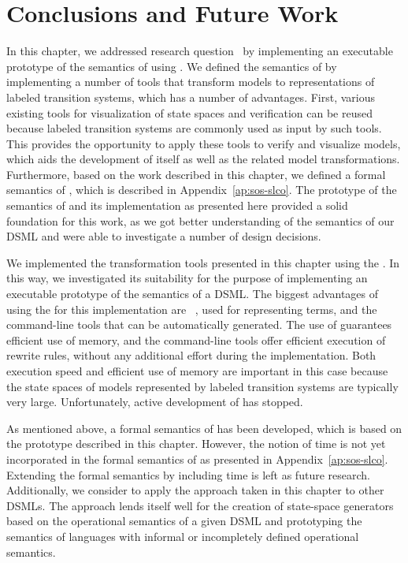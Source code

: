 \section{Conclusions and Future Work}
\label{sec:prototype-semantics:Conclusions_and_Future_Work}

In this chapter, we addressed research question~ by implementing an executable prototype of the semantics of \SLCO using \ASFSDF.
We defined the semantics of \SLCO by implementing a number of tools that transform \SLCO models to representations of labeled transition systems, which has a number of advantages.
First, various existing tools for visualization of state spaces and verification can be reused because labeled transition systems are commonly used as input by such tools.
This provides the opportunity to apply these tools to verify and visualize \SLCO models, which aids the development of \SLCO itself as well as the related model transformations.
Furthermore, based on the work described in this chapter, we defined a formal semantics of \SLCO, which is described in Appendix~\ref{ap:sos-slco}.
The prototype of the semantics of \SLCO and its implementation as presented here provided a solid foundation for this work, as we got better understanding of the semantics of our DSML and were able to investigate a number of design decisions.

We implemented the transformation tools presented in this chapter using the \ASFSDFME.
In this way, we investigated its suitability for the purpose of implementing an executable prototype of the semantics of a DSML.
The biggest advantages of using the \ASFSDFME for this implementation are \ATerms~\cite{Brand:2007:AME:1219180.1219600}, used for representing terms, and the command-line tools that can be automatically generated.
The use of \ATerms guarantees efficient use of memory, and the command-line tools offer efficient execution of rewrite rules, without any additional effort during the implementation.
Both execution speed and efficient use of memory are important in this case because the state spaces of models represented by labeled transition systems are typically very large.
Unfortunately, active development of \ASFSDF has stopped.

As mentioned above, a formal semantics of \SLCO has been developed, which is based on the prototype described in this chapter.
However, the notion of time is not yet incorporated in the formal semantics of \SLCO as presented in Appendix~\ref{ap:sos-slco}.
Extending the formal semantics by including time is left as future research.
Additionally, we consider to apply the approach taken in this chapter to other DSMLs.
The approach lends itself well for the creation of state-space generators based on the operational semantics of a given DSML and prototyping the semantics of languages with informal or incompletely defined operational semantics. 